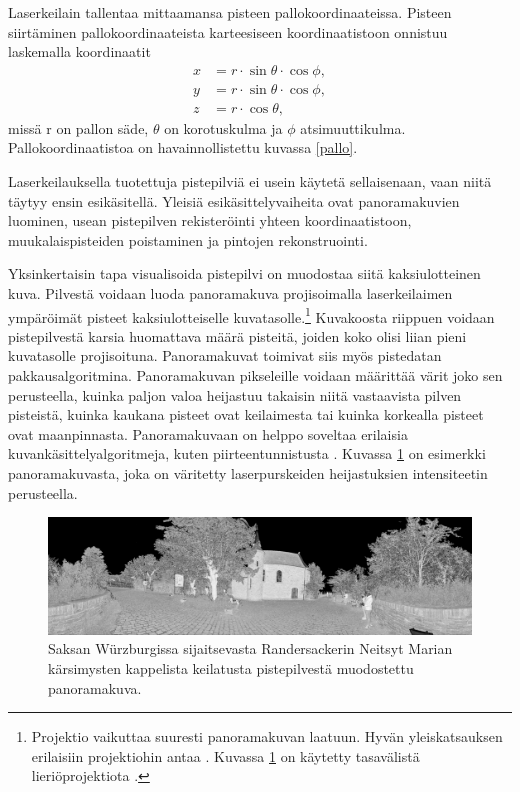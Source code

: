 Laserkeilain tallentaa mittaamansa pisteen pallokoordinaateissa. Pisteen siirtäminen pallokoordinaateista karteesiseen koordinaatistoon onnistuu laskemalla koordinaatit 
\begin{equation}
    \begin{split}
        x&=r \cdot \sin \theta \cdot \cos \phi,\\ 
        y&=r \cdot \sin \theta \cdot \cos \phi,\\
        z&=r \cdot \cos \theta,    
    \end{split}
\end{equation}
missä r on pallon säde, $\theta$ on korotuskulma ja $\phi$ atsimuuttikulma. Pallokoordinaatistoa on havainnollistettu kuvassa \ref{pallo}.

Laserkeilauksella tuotettuja pistepilviä ei usein käytetä sellaisenaan, vaan niitä täytyy ensin esikäsitellä. Yleisiä esikäsittelyvaiheita ovat panoramakuvien luominen, usean pistepilven rekisteröinti yhteen koordinaatistoon, muukalaispisteiden poistaminen ja pintojen rekonstruointi.

Yksinkertaisin tapa visualisoida pistepilvi on muodostaa siitä kaksiulotteinen kuva. Pilvestä voidaan luoda panoramakuva projisoimalla laserkeilaimen ympäröimät pisteet kaksiulotteiselle kuvatasolle.\footnote{Projektio vaikuttaa suuresti panoramakuvan laatuun. Hyvän yleiskatsauksen erilaisiin projektiohin antaa \cite{proj}. Kuvassa \ref{img:pano} on käytetty tasavälistä lieriöprojektiota .} Kuvakoosta riippuen voidaan pistepilvestä karsia huomattava määrä pisteitä, joiden koko olisi liian pieni kuvatasolle projisoituna. Panoramakuvat toimivat siis myös pistedatan pakkausalgoritmina. Panoramakuvan pikseleille voidaan määrittää värit joko sen perusteella, kuinka paljon valoa heijastuu takaisin niitä vastaavista pilven pisteistä, kuinka kaukana pisteet ovat keilaimesta tai kuinka korkealla pisteet ovat maanpinnasta. Panoramakuvaan on helppo soveltaa erilaisia kuvankäsittelyalgoritmeja, kuten piirteentunnistusta . Kuvassa \ref{img:pano} on esimerkki panoramakuvasta, joka on väritetty laserpurskeiden heijastuksien intensiteetin perusteella.

\begin{figure}
    \centering
    \includegraphics[width=\textwidth]{img/pano.png}
    \caption{Saksan Würzburgissa sijaitsevasta Randersackerin Neitsyt Marian kärsimysten kappelista keilatusta pistepilvestä muodostettu panoramakuva.}
    \label{img:pano}
\end{figure}

